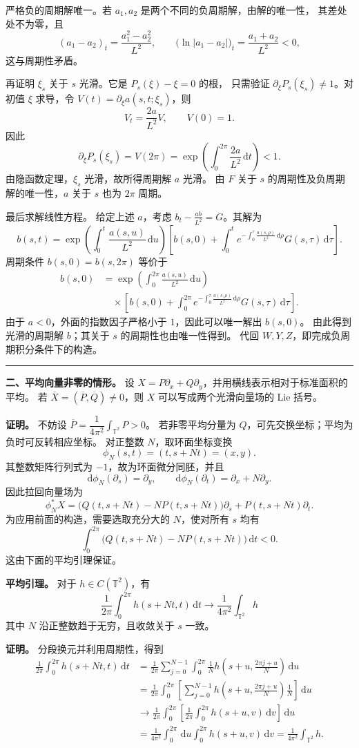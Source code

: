 \documentclass[11pt,a4paper]{ctexart}
\newcommand{\T}{\mathbb T}
\newcommand{\dd}{\,\mathrm d}
\newcommand{\sep}{\par\vspace{5pt}\noindent\rule{\linewidth}{0.7pt}\par\vspace{5pt}}
\begin{document}
严格负的周期解唯一。若 $a_1,a_2$ 是两个不同的负周期解，由解的唯一性，
其差处处不为零，且
\[(a_1-a_2)_t=\frac{a_1^2-a_2^2}{L^2},\qquad
\bigl(\ln|a_1-a_2|\bigr)_t=\frac{a_1+a_2}{L^2}<0,\]
这与周期性矛盾。

再证明 $\xi_s$ 关于 $s$ 光滑。它是 $P_s(\xi)-\xi=0$ 的根，
只需验证 $\partial_\xi P_s(\xi_s)\ne1$。对初值 $\xi$ 求导，令
$V(t)=\partial_\xi a(s,t;\xi_s)$，则
\[V_t=\frac{2a}{L^2}V,\qquad V(0)=1.\]
因此
\[\partial_\xi P_s(\xi_s)=V(2\pi)
=\exp\!\left(\int_0^{2\pi}\frac{2a}{L^2}\dd t\right)<1.\]
由隐函数定理，$\xi_s$ 光滑，故所得周期解 $a$ 光滑。
由 $F$ 关于 $s$ 的周期性及负周期解的唯一性，$a$ 关于 $s$ 也为 $2\pi$ 周期。

最后求解线性方程。 给定上述 $a$，考虑 $b_t-\frac{ab}{L^2}=G$。其解为
\[b(s,t)=\exp\!\left(\int_0^t\frac{a(s,u)}{L^2}\dd u\right)
\left[b(s,0)+\int_0^t
e^{-\int_0^\tau\frac{a(s,\rho)}{L^2}\dd\rho}G(s,\tau)\dd\tau\right].\]
周期条件 $b(s,0)=b(s,2\pi)$ 等价于
\begin{align*}
b(s,0)
&=\exp\!\left(\int_0^{2\pi}\frac{a(s,u)}{L^2}\dd u\right)\\[-2pt]
&\quad\times\left[b(s,0)+\int_0^{2\pi}
e^{-\int_0^\tau\frac{a(s,\rho)}{L^2}\dd\rho}G(s,\tau)\dd\tau\right].
\end{align*}
由于 $a<0$，外面的指数因子严格小于 $1$，因此可以唯一解出 $b(s,0)$。
由此得到光滑的周期解 $b$；其关于 $s$ 的周期性也由唯一性得到。
代回 $W,Y,Z$，即完成负周期积分条件下的构造。
\sep
\textbf{二、平均向量非零的情形。}
设 $X=P\partial_x+Q\partial_y$，并用横线表示相对于标准面积的平均。
若 $\overline X=(\overline P,\overline Q)\ne0$，则 $X$ 可以写成两个光滑向量场的 Lie 括号。

\textbf{证明。} 不妨设 $\overline P=\dfrac1{4\pi^2}\int_{\T^2}P>0$。
若非零平均分量为 $Q$，可先交换坐标；平均为负时可反转相应坐标。
对正整数 $N$，取环面坐标变换
\[\phi_N(s,t)=(t,s+Nt)=(x,y).\]
其整数矩阵行列式为 $-1$，故为环面微分同胚，并且
\[\mathrm d\phi_N(\partial_s)=\partial_y,\qquad
\mathrm d\phi_N(\partial_t)=\partial_x+N\partial_y.\]
因此拉回向量场为
\[\phi_N^*X=
\bigl(Q(t,s+Nt)-NP(t,s+Nt)\bigr)\partial_s
+P(t,s+Nt)\partial_t.\]
为应用前面的构造，需要选取充分大的 $N$，使对所有 $s$ 均有
\[\int_0^{2\pi}\bigl(Q(t,s+Nt)-NP(t,s+Nt)\bigr)\dd t<0.\]
这由下面的平均引理保证。

\textbf{平均引理。} 对于 $h\in C(\T^2)$，有
\[\frac1{2\pi}\int_0^{2\pi}h(s+Nt,t)\dd t
\longrightarrow\frac1{4\pi^2}\int_{\T^2}h\]
其中 $N$ 沿正整数趋于无穷，且收敛关于 $s$ 一致。

\textbf{证明。} 分段换元并利用周期性，得到
\begin{align*}
\frac1{2\pi}\int_0^{2\pi}h(s+Nt,t)\dd t
&=\frac1{2\pi}\sum_{j=0}^{N-1}\int_0^{2\pi}
\frac1N h\!\left(s+u,\frac{2\pi j+u}{N}\right)\dd u\\
&=\frac1{2\pi}\int_0^{2\pi}\left[\sum_{j=0}^{N-1}
h\!\left(s+u,\frac{2\pi j+u}{N}\right)\frac1N\right]\dd u\\
&\longrightarrow\frac1{2\pi}\int_0^{2\pi}
\left[\frac1{2\pi}\int_0^{2\pi}h(s+u,v)\dd v\right]\dd u\\
&=\frac1{4\pi^2}\int_0^{2\pi}\dd u\int_0^{2\pi}h(s+u,v)\dd v
=\frac1{4\pi^2}\int_{\T^2}h.
\end{align*}
\end{document}
